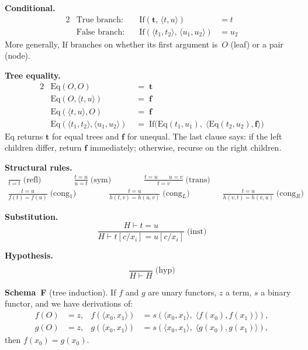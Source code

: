 \documentclass[11pt]{article}
\newcommand{\pair}[2]{\langle #1, #2 \rangle}
\newcommand{\true}{\mathbf{t}}
\newcommand{\false}{\mathbf{f}}
\newcommand{\SchemaF}{\textbf{Schema~F}}
\begin{document}
\noindent
\textbf{Conditional.}
\begin{alignat*}{2}
  &\text{True branch:}     &\quad \mathrm{If}(\true,\, \pair{t}{u}) &= t \\
  &\text{False branch:}     &\quad \mathrm{If}(\pair{t_1}{t_2},\, \pair{u_1}{u_2}) &= u_2
\end{alignat*}
More generally, $\mathrm{If}$ branches on whether its first
argument is~$O$ (leaf) or a pair (node).

\medskip\noindent
\textbf{Tree equality.}
\begin{alignat*}{2}
  &\mathrm{Eq}(O, O) &\;=\; \true \\
  &\mathrm{Eq}(O, \pair{t}{u}) &\;=\; \false \\
  &\mathrm{Eq}(\pair{t}{u}, O) &\;=\; \false \\
  &\mathrm{Eq}(\pair{t_1}{t_2}, \pair{u_1}{u_2})
    &\;=\; \mathrm{If}\bigl(\mathrm{Eq}(t_1, u_1),\;
         \pair{\mathrm{Eq}(t_2, u_2)}{\false}\bigr)
\end{alignat*}
$\mathrm{Eq}$ returns $\true$ for equal trees and $\false$ for
unequal.  The last clause says: if the left children differ, return
$\false$ immediately; otherwise, recurse on the right children.

\medskip\noindent
\textbf{Structural rules.}
\begin{gather*}
  \frac{\phantom{t=t}}{t = t}\;\text{(refl)}
  \qquad\qquad
  \frac{t = u}{u = t}\;\text{(sym)}
  \qquad\qquad
  \frac{t = u \qquad u = v}{t = v}\;\text{(trans)}
  \\[8pt]
  \frac{t = u}{f(t) = f(u)}\;\text{(cong$_1$)}
  \qquad\qquad
  \frac{t = u}{h(t, v) = h(u, v)}\;\text{(cong$_L$)}
  \qquad\qquad
  \frac{t = u}{h(v, t) = h(v, u)}\;\text{(cong$_R$)}
\end{gather*}

\noindent
\textbf{Substitution.}
\[
  \frac{H \vdash t = u}
       {H \vdash t[c/x_i] = u[c/x_i]}
  \;\text{(inst)}
\]

\noindent
\textbf{Hypothesis.}
\[
  \frac{\phantom{H}}{H \vdash H}
  \;\text{(hyp)}
\]

\noindent
\textbf{\SchemaF} (tree induction).
If $f$ and $g$ are unary functors, $z$ a term, $s$ a binary functor,
and we have derivations of:
\begin{align*}
  f(O) &= z,  &  f(\pair{x_0}{x_1}) &= s(\pair{x_0}{x_1},\; \pair{f(x_0)}{f(x_1)}), \\
  g(O) &= z,  &  g(\pair{x_0}{x_1}) &= s(\pair{x_0}{x_1},\; \pair{g(x_0)}{g(x_1)}),
\end{align*}
then $f(x_0) = g(x_0)$.
\end{document}
